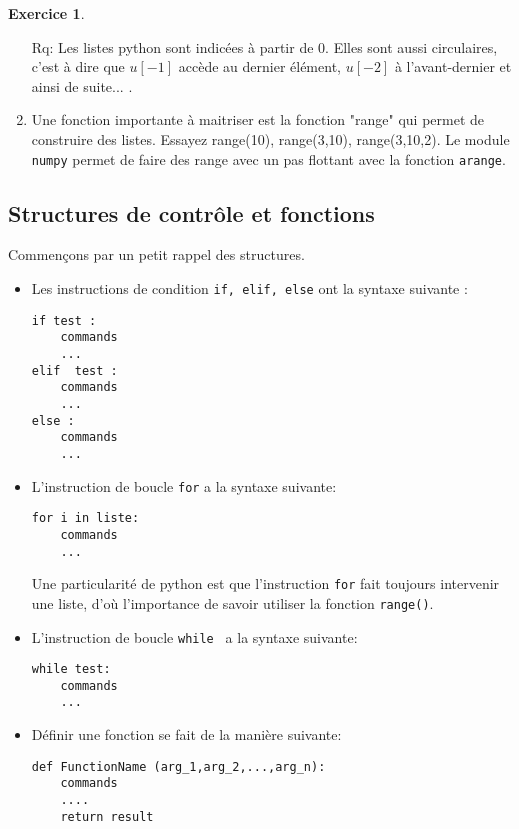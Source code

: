\documentclass[a4paper,francais,11pt]{article}
\theoremstyle{definition}
\newtheorem{exercice}{Exercice}
\begin{document}
\begin{exercice}
\begin{enumerate}
Rq: Les listes python sont indicées à partir de $0$. Elles sont aussi circulaires, c'est à dire que $u[-1]$ accède au dernier élément, $u[-2]$ à l'avant-dernier et ainsi de suite... .\\

  \item Une fonction importante à maitriser est la fonction "range" qui permet de construire des listes. Essayez range(10), range(3,10), range(3,10,2). Le module {\tt numpy} permet de faire des range avec un pas flottant avec la fonction {\tt arange}.

  \end{enumerate}
\end{exercice}

\subsection{Structures de contr\^ole et fonctions}
Commençons par un petit rappel des structures. \\
\begin{itemize}
\item Les instructions de condition {\tt if, elif, else} ont la syntaxe suivante : 
\begin{verbatim}
if test :
    commands
    ...
elif  test : 
    commands
    ...
else :
    commands
    ...
\end{verbatim}



\item L'instruction de boucle {\tt for} a la syntaxe suivante:  
\begin{verbatim}
for i in liste:
    commands
    ...

\end{verbatim}



Une particularité de python est que l'instruction {\tt for} fait toujours intervenir une liste, d'où l'importance de savoir utiliser la fonction {\tt range()}.
\item L'instruction de boucle {\tt while } a la syntaxe suivante: 
\begin{verbatim}
while test:
    commands
    ...
\end{verbatim}
\item Définir une fonction se fait de la manière suivante: 

\begin{verbatim}
def FunctionName (arg_1,arg_2,...,arg_n):
    commands
    ....
    return result
\end{verbatim}
\end{itemize}
\end{document}
